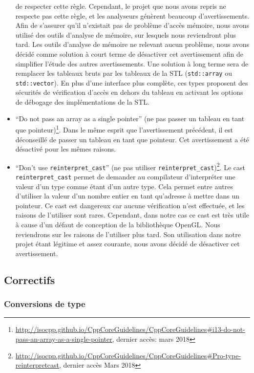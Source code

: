 \begin{itemize}
  de respecter cette règle. Cependant, le projet que nous avons repris
  ne respecte pas cette règle, et les analyseurs génèrent beaucoup
  d'avertissements. Afin de s'assurer qu'il n'existait pas de problème
  d'accès mémoire, nous avons utilisé des outils d'analyse de mémoire,
  sur lesquels nous reviendront plus tard. Les outils d'analyse de
  mémoire ne relevant aucun problème, nous avons décidé comme solution
  à court terme de désactiver cet avertissement afin de simplifier
  l'étude des autres avertissements. Une solution à long terme sera de
  remplacer les tableaux bruts par les tableaux de la STL
  (\texttt{std::array} ou \texttt{std::vector}). En plus d'une interface
  plus complète, ces types proposent des sécurités de vérification
  d'accès en dehors du tableau en activant les options de débogage des
  implémentations de la STL.
\item
  ``Do not pass an array as a single pointer'' (ne pas passer un tableau
  en tant que
  pointeur)\footnote{\url{http://isocpp.github.io/CppCoreGuidelines/CppCoreGuidelines\#i13-do-not-pass-an-array-as-a-single-pointer}, dernier accès: mars 2018}. Dans le même esprit que
  l'avertissement précédent, il est déconseillé de passer un tableau en
  tant que pointeur. Cet avertissement a été désactivé pour les mêmes
  raisons.
\item
  ``Don't use \texttt{reinterpret\_cast}'' (ne pas utiliser
  \texttt{reinterpret\_cast})\footnote{\url{http://isocpp.github.io/CppCoreGuidelines/CppCoreGuidelines\#Pro-type-reinterpretcast}, dernier accès Mars 2018}. Le cast
  \texttt{reinterpret\_cast} permet de demander au compilateur
  d'interpréter une valeur d'un type comme étant d'un autre type. Cela
  permet entre autres d'utiliser la valeur d'un nombre entier en tant
  qu'adresse à mettre dans un pointeur. Ce cast est dangereux car
  aucune vérification n'est effectuée, et les raisons de l'utiliser sont
  rares. Cependant, dans notre cas ce cast est très utile à cause d'un
  défaut de conception de la bibliothèque OpenGL. Nous reviendrons sur
  les raisons de l'utiliser plus tard. Son utilisation dans notre projet
  étant légitime et assez courante, nous avons décidé de désactiver cet
  avertissement.
\end{itemize}

\subsection{Correctifs}

\subsubsection{Conversions de type}\label{conversions-de-type}

